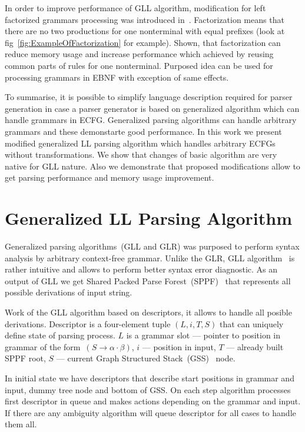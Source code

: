 \documentclass[runningheads,a4paper]{llncs}
\begin{document}
In order to improve performance of GLL algorithm, modification for left factorized grammars processing was introduced in~\cite{scott2016structuring}.
Factorization means that there are no two productions for one nonterminal with equal prefixes (look at fig~\ref{fig:ExampleOfFactorization} for example).
Shown, that factorization can reduce memory usage and increase performance which achieved by reusing common parts of rules for one nonterminal.
Purposed idea can be used for processing grammars in EBNF with exception of same effects.

To summarise, it is possible to simplify language description required for parser generation in case a parser generator is based on generalized algorithm which can handle grammars in ECFG.
Generalized parsing algorithms can handle arbitrary grammars and these demonstarte good performance.
In this work we present modified generalized LL parsing algorithm which handles arbitrary ECFGs without transformations.
We show that changes of basic algorithm are very native for GLL nature. 
Also we demonstrate that proposed modifications allow to get parsing performance and memory usage improvement.


\section{Generalized LL Parsing Algorithm}%

Generalized parsing algorithms~(GLL and GLR) was purposed to perform syntax analysis by arbitrary context-free 
grammar. Unlike the GLR, GLL algorithm~\cite{scott2010gll} is rather intuitive and allows to perform better syntax error diagnostic.
As an output of GLL we get Shared Packed Parse Forest~(SPPF)~\cite{scott2013gll} that represents all possible derivations of input string.

Work of the GLL algorithm based on descriptors, it allows to handle all posible derivations.
Descriptor is a four-element tuple $(L, i, T, S)$ that can uniquely define state of parsing process. 
$L$ is a grammar slot --- pointer to position in grammar of the form~$(S \to \alpha \cdot \beta)$, $i$ --- position in input,
$T$ --- already built SPPF root, $S$ --- current Graph Structured Stack~(GSS)~\cite{GSS} node.

In initial state we have descriptors that describe start positions in grammar and input, dummy tree node and bottom of GSS.
On each step algorithm processes first descriptor in queue and makes actions depending on the grammar and input.
If there are any ambiguity algorithm will queue descriptor for all cases to handle them all. 
\end{document}
